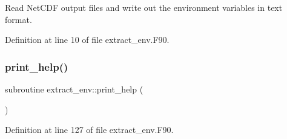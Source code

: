 Read Net\+C\+DF output files and write out the environment variables in text format. 



Definition at line 10 of file extract\+\_\+env.\+F90.

\mbox{\label{extract__env_8_f90_aa8cac5bded68ccda19a12136abe75f4d}} 
\subsubsection{\texorpdfstring{print\+\_\+help()}{print\_help()}}
{\footnotesize\ttfamily subroutine extract\+\_\+env\+::print\+\_\+help (\begin{DoxyParamCaption}{ }\end{DoxyParamCaption})}



Definition at line 127 of file extract\+\_\+env.\+F90.

